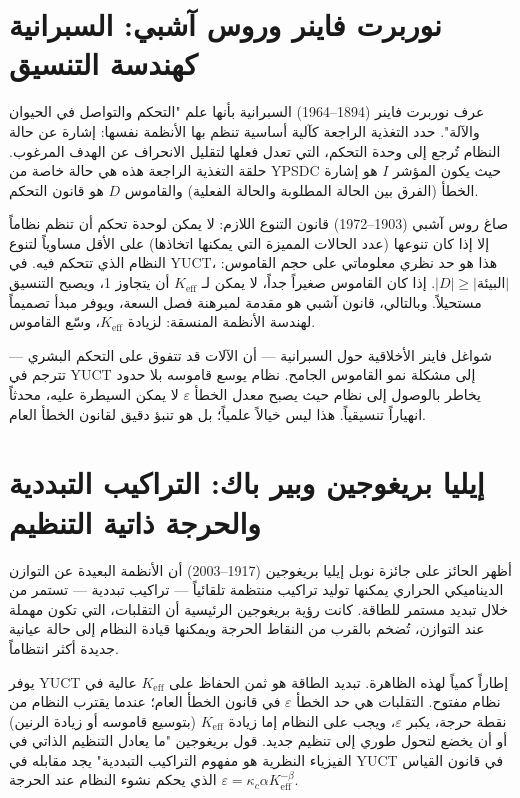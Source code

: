 \documentclass[12pt,a4paper]{article}
\begin{document}
	\section{نوربرت فاينر وروس آشبي: السبرانية كهندسة التنسيق}
	
	عرف نوربرت فاينر (1894–1964) السبرانية بأنها علم "التحكم والتواصل في الحيوان والآلة". حدد التغذية الراجعة كآلية أساسية تنظم بها الأنظمة نفسها: إشارة عن حالة النظام تُرجع إلى وحدة التحكم، التي تعدل فعلها لتقليل الانحراف عن الهدف المرغوب. حلقة التغذية الراجعة هذه هي حالة خاصة من YPSDC حيث يكون المؤشر \(I\) هو إشارة الخطأ (الفرق بين الحالة المطلوبة والحالة الفعلية) والقاموس \(D\) هو قانون التحكم.
	
	صاغ روس آشبي (1903–1972) قانون التنوع اللازم: لا يمكن لوحدة تحكم أن تنظم نظاماً إلا إذا كان تنوعها (عدد الحالات المميزة التي يمكنها اتخاذها) على الأقل مساوياً لتنوع النظام الذي تتحكم فيه. في YUCT، هذا هو حد نظري معلوماتي على حجم القاموس: \(|D| \ge |\text{البيئة}|\). إذا كان القاموس صغيراً جداً، لا يمكن لـ \(K_{\mathrm{eff}}\) أن يتجاوز 1، ويصبح التنسيق مستحيلاً. وبالتالي، قانون آشبي هو مقدمة لمبرهنة فصل السعة، ويوفر مبدأ تصميماً لهندسة الأنظمة المنسقة: لزيادة \(K_{\mathrm{eff}}\)، وسّع القاموس.
	
	شواغل فاينر الأخلاقية حول السبرانية — أن الآلات قد تتفوق على التحكم البشري — تترجم في YUCT إلى مشكلة نمو القاموس الجامح. نظام يوسع قاموسه بلا حدود يخاطر بالوصول إلى نظام حيث يصبح معدل الخطأ \(\varepsilon\) لا يمكن السيطرة عليه، محدثاً انهياراً تنسيقياً. هذا ليس خيالاً علمياً؛ بل هو تنبؤ دقيق لقانون الخطأ العام.
	
	\section{إيليا بريغوجين وبير باك: التراكيب التبددية والحرجة ذاتية التنظيم}
	
	أظهر الحائز على جائزة نوبل إيليا بريغوجين (1917–2003) أن الأنظمة البعيدة عن التوازن الديناميكي الحراري يمكنها توليد تراكيب منتظمة تلقائياً — تراكيب تبددية — تستمر من خلال تبديد مستمر للطاقة. كانت رؤية بريغوجين الرئيسية أن التقلبات، التي تكون مهملة عند التوازن، تُضخم بالقرب من النقاط الحرجة ويمكنها قيادة النظام إلى حالة عيانية جديدة أكثر انتظاماً.
	
	يوفر YUCT إطاراً كمياً لهذه الظاهرة. تبديد الطاقة هو ثمن الحفاظ على \(K_{\mathrm{eff}}\) عالية في نظام مفتوح. التقلبات هي حد الخطأ \(\varepsilon\) في قانون الخطأ العام؛ عندما يقترب النظام من نقطة حرجة، يكبر \(\varepsilon\)، ويجب على النظام إما زيادة \(K_{\mathrm{eff}}\) (بتوسيع قاموسه أو زيادة الرنين) أو أن يخضع لتحول طوري إلى تنظيم جديد. قول بريغوجين "ما يعادل التنظيم الذاتي في الفيزياء النظرية هو مفهوم التراكيب التبددية" يجد مقابله في YUCT في قانون القياس \(\varepsilon = \kappa_c \alpha K_{\mathrm{eff}}^{-\beta}\) الذي يحكم نشوء النظام عند الحرجة.
	
\end{document}
